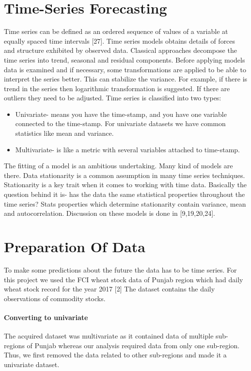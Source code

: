 \documentclass[runningheads]{llncs}
\begin{document}
\section{Time-Series Forecasting}
Time series can be defined as an ordered sequence of values of a variable at equally spaced time intervals [27]. Time series models obtains details of forces and structure exhibited by observed data. Classical approaches decompose the time series into trend, seasonal and residual components. Before applying models data is examined and if necessary, some transformations are applied to be able to interpret the series better. This can stabilize the variance. For example, if there is trend in the series then logarithmic transformation is suggested. If there are outliers they need to be adjusted.
\linebreak Time series is classified into two types:
\begin{itemize}
\item Univariate- means you have the time-stamp, and you have one variable connected to the time-stamp. For univariate datasets we have common statistics like mean and variance.
\item Multivariate- is like a metric with several variables attached to time-stamp.
\end{itemize}
The fitting of a model is an ambitious undertaking. Many kind of models are there. Data stationarity is a common assumption in many time series techniques. Stationarity is a key trait when it comes to working with time data. Basically the question behind it is- has the data the same statistical properties throughout the time series? Stats properties which determine stationarity contain variance, mean and autocorrelation. Discussion on these models is done in [9,19,20,24].
%
%
%
\section{Preparation Of Data}
To make some predictions about the future the data has to be time series. For this project we used the FCI wheat stock data of Punjab region which had daily wheat stock record for the year 2017 [2] The dataset contains the daily observations of commodity stocks.
 \paragraph{Converting to univariate} The acquired dataset was multivariate as it contained data of multiple sub-regions of Punjab whereas our analysis required data from only one sub-region. Thus, we first removed the data related to other sub-regions and made it a univariate dataset. 
\end{document}
